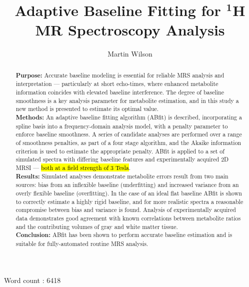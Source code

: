 \documentclass[num-refs]{wiley-article}
\title{Adaptive Baseline Fitting for $^{\textbf{1}}$H MR Spectroscopy Analysis}
\author[1]{Martin Wilson}
\affil[1]{Centre for Human Brain Health and School of Psychology, University of Birmingham, Birmingham, UK.}
\newcommand{\revone}[2]{\hl{#1}\marginnote{\hl{#2}}}
\begin{document}
\maketitle

\begin{abstract}
    \textbf{Purpose:} Accurate baseline modeling is essential for reliable MRS analysis and interpretation --- particularly at short echo-times, where enhanced metabolite information coincides with elevated baseline interference. The degree of baseline smoothness is a key analysis parameter for metabolite estimation, and in this study a new method is presented to estimate its optimal value. \\
    \textbf{Methods:} An adaptive baseline fitting algorithm (ABfit) is described, incorporating a spline basis into a frequency-domain analysis model, with a penalty parameter to enforce baseline smoothness. A series of candidate analyses are performed over a range of smoothness penalties, as part of a four stage algorithm, and the Akaike information criterion is used to estimate the appropriate penalty. ABfit is applied to a set of simulated spectra with differing baseline features and experimentally acquired 2D MRSI --- \revone{both at a field strength of 3 Tesla}{R2.5}. \\
    \textbf{Results:} Simulated analyses demonstrate metabolite errors result from two main sources: bias from an inflexible baseline (underfitting) and increased variance from an overly flexible baseline (overfitting). In the case of an ideal flat baseline ABfit is shown to correctly estimate a highly rigid baseline, and for more realistic spectra a reasonable compromise between bias and variance is found. Analysis of experimentally acquired data demonstrates good agreement with known correlations between metabolite ratios and the contributing volumes of gray and white matter tissue. \\
    \textbf{Conclusion:} ABfit has been shown to perform accurate baseline estimation and is suitable for fully-automated routine MRS analysis.
\end{abstract}

Word count : 6418

\end{document}
